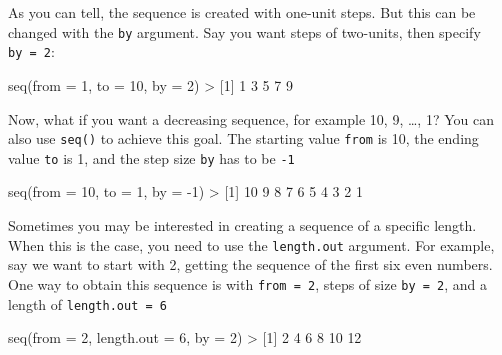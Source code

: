 \documentclass[
]{book}
\newenvironment{Shaded}{\begin{snugshade}}{\end{snugshade}}
\newcommand{\AttributeTok}[1]{\textcolor[rgb]{0.77,0.63,0.00}{#1}}
\newcommand{\DecValTok}[1]{\textcolor[rgb]{0.00,0.00,0.81}{#1}}
\newcommand{\FunctionTok}[1]{\textcolor[rgb]{0.00,0.00,0.00}{#1}}
\newcommand{\NormalTok}[1]{#1}
\newcommand{\SpecialCharTok}[1]{\textcolor[rgb]{0.00,0.00,0.00}{#1}}
\begin{document}
As you can tell, the sequence is created with one-unit steps. But this can
be changed with the \texttt{by} argument. Say you want steps of two-units, then
specify \texttt{by\ =\ 2}:

\begin{Shaded}
\begin{Highlighting}[]
\FunctionTok{seq}\NormalTok{(}\AttributeTok{from =} \DecValTok{1}\NormalTok{, }\AttributeTok{to =} \DecValTok{10}\NormalTok{, }\AttributeTok{by =} \DecValTok{2}\NormalTok{)}
\SpecialCharTok{\textgreater{}}\NormalTok{ [}\DecValTok{1}\NormalTok{] }\DecValTok{1} \DecValTok{3} \DecValTok{5} \DecValTok{7} \DecValTok{9}
\end{Highlighting}
\end{Shaded}

Now, what if you want a decreasing sequence, for example 10, 9, \ldots, 1?
You can also use \texttt{seq()} to achieve this goal. The starting value \texttt{from} is 10,
the ending value \texttt{to} is 1, and the step size \texttt{by} has to be \texttt{-1}

\begin{Shaded}
\begin{Highlighting}[]
\FunctionTok{seq}\NormalTok{(}\AttributeTok{from =} \DecValTok{10}\NormalTok{, }\AttributeTok{to =} \DecValTok{1}\NormalTok{, }\AttributeTok{by =} \SpecialCharTok{{-}}\DecValTok{1}\NormalTok{)}
\SpecialCharTok{\textgreater{}}\NormalTok{  [}\DecValTok{1}\NormalTok{] }\DecValTok{10}  \DecValTok{9}  \DecValTok{8}  \DecValTok{7}  \DecValTok{6}  \DecValTok{5}  \DecValTok{4}  \DecValTok{3}  \DecValTok{2}  \DecValTok{1}
\end{Highlighting}
\end{Shaded}

Sometimes you may be interested in creating a sequence of a specific length.
When this is the case, you need to use the \texttt{length.out} argument. For example,
say we want to start with 2, getting the sequence of the first six even numbers.
One way to obtain this sequence is with \texttt{from\ =\ 2}, steps of size \texttt{by\ =\ 2},
and a length of \texttt{length.out\ =\ 6}

\begin{Shaded}
\begin{Highlighting}[]
\FunctionTok{seq}\NormalTok{(}\AttributeTok{from =} \DecValTok{2}\NormalTok{, }\AttributeTok{length.out =} \DecValTok{6}\NormalTok{, }\AttributeTok{by =} \DecValTok{2}\NormalTok{)}
\SpecialCharTok{\textgreater{}}\NormalTok{ [}\DecValTok{1}\NormalTok{]  }\DecValTok{2}  \DecValTok{4}  \DecValTok{6}  \DecValTok{8} \DecValTok{10} \DecValTok{12}
\end{Highlighting}
\end{Shaded}
\end{document}
